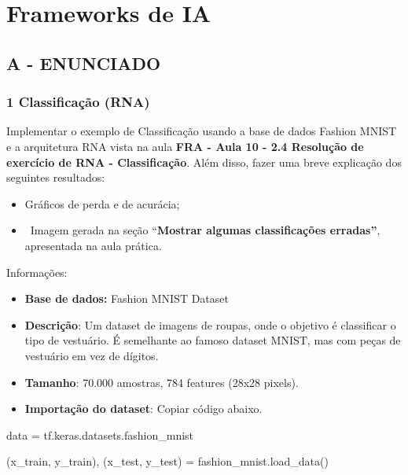 \label{ap:ap13}
\chapter{Frameworks de IA}
\section*{\textbf{A - ENUNCIADO}}

\subsection*{\textbf{1 Classificação (RNA)}}


Implementar o exemplo de Classificação usando a base de dados Fashion MNIST e a arquitetura RNA vista na aula
\textbf{FRA - Aula 10 - 2.4 Resolução de exercício de RNA - Classificação}. Além disso, fazer uma breve explicação dos
seguintes resultados: 

\begin{itemize}[series=listWWNumxiv,label={}-]
\item Gráficos de perda e de acurácia;
\item \ Imagem gerada na seção “\textbf{\textcolor[HTML]{2F5496}{Mostrar algumas classificações erradas”}}, apresentada
na aula prática.
\end{itemize}
Informações:

\begin{itemize}[series=listWWNumxiii,label=${\bullet}$]
\item \textbf{Base de dados: }Fashion MNIST Dataset 
\item \textbf{Descrição}: Um dataset de imagens de roupas, onde o objetivo é classificar o tipo de vestuário. É
semelhante ao famoso dataset MNIST, mas com peças de vestuário em vez de dígitos.
\item \textbf{Tamanho}: 70.000 amostras, 784 features (28x28 pixels).
\end{itemize}
\begin{itemize}[series=listWWNumxvi,label=${\bullet}$]
\item \textbf{Importação do dataset}: Copiar código abaixo.
\end{itemize}

\foreignlanguage{english}{\textcolor[HTML]{188038}{data = tf.keras.datasets.fashion\_mnist }}

\foreignlanguage{english}{\textcolor[HTML]{188038}{(x\_train, y\_train), (x\_test, y\_test) =
fashion\_mnist.load\_data()}}


